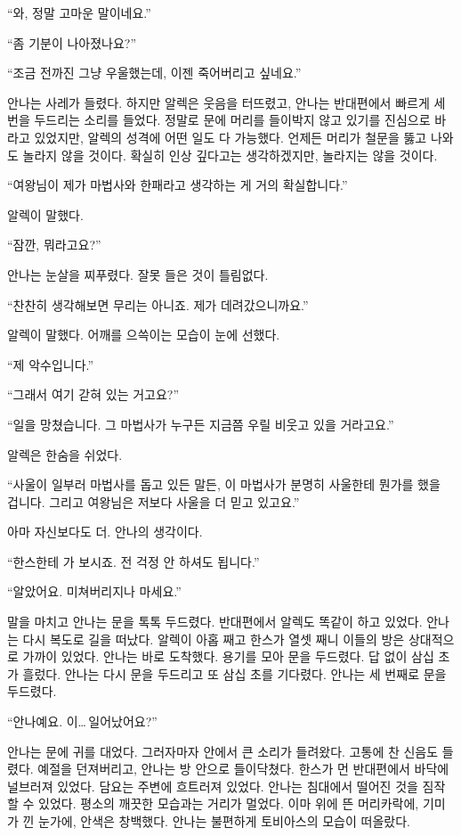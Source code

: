 ``와, 정말 고마운 말이네요.''

``좀 기분이 나아졌나요?''

``조금 전까진 그냥 우울했는데, 이젠 죽어버리고 싶네요.''

안나는 사레가 들렸다. 하지만 알렉은 웃음을 터뜨렸고, 안나는 반대편에서 빠르게 세 번을 두드리는 소리를 들었다. 정말로 문에 머리를 들이박지 않고 있기를 진심으로 바라고 있었지만, 알렉의 성격에 어떤 일도 다 가능했다. 언제든 머리가 철문을 뚫고 나와도 놀라지 않을 것이다. 확실히 인상 깊다고는 생각하겠지만, 놀라지는 않을 것이다.

``여왕님이 제가 마법사와 한패라고 생각하는 게 거의 확실합니다.''

알렉이 말했다.

``잠깐, 뭐라고요?''

안나는 눈살을 찌푸렸다. 잘못 들은 것이 틀림없다.

``찬찬히 생각해보면 무리는 아니죠. 제가 데려갔으니까요.''

알렉이 말했다. 어깨를 으쓱이는 모습이 눈에 선했다.

``제 악수입니다.''

``그래서 여기 갇혀 있는 거고요?''

``일을 망쳤습니다. 그 마법사가 누구든 지금쯤 우릴 비웃고 있을 거라고요.''

알렉은 한숨을 쉬었다.

``사울이 일부러 마법사를 돕고 있든 말든, 이 마법사가 분명히 사울한테 뭔가를 했을 겁니다. 그리고 여왕님은 저보다 사울을 더 믿고 있고요.''

아마 자신보다도 더. 안나의 생각이다.

``한스한테 가 보시죠. 전 걱정 안 하셔도 됩니다.''

``알았어요. 미쳐버리지나 마세요.''

말을 마치고 안나는 문을 톡톡 두드렸다. 반대편에서 알렉도 똑같이 하고 있었다. 안나는 다시 복도로 길을 떠났다. 알렉이 아홉 째고 한스가 열셋 째니 이들의 방은 상대적으로 가까이 있었다. 안나는 바로 도착했다. 용기를 모아 문을 두드렸다. 답 없이 삼십 초가 흘렀다. 안나는 다시 문을 두드리고 또 삼십 초를 기다렸다. 안나는 세 번째로 문을 두드렸다.

``안나예요. 이\ldots\,일어났어요?''

안나는 문에 귀를 대었다. 그러자마자 안에서 큰 소리가 들려왔다. 고통에 찬 신음도 들렸다. 예절을 던져버리고, 안나는 방 안으로 들이닥쳤다. 한스가 먼 반대편에서 바닥에 널브러져 있었다. 담요는 주변에 흐트러져 있었다. 안나는 침대에서 떨어진 것을 짐작할 수 있었다. 평소의 깨끗한 모습과는 거리가 멀었다. 이마 위에 뜬 머리카락에, 기미가 낀 눈가에, 안색은 창백했다. 안나는 불편하게 토비아스의 모습이 떠올랐다.

